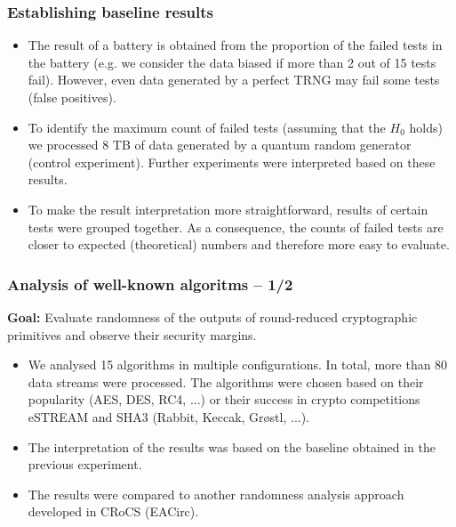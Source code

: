 \documentclass[aspectratio=169]{beamer}
\begin{document}
\begin{frame}
\frametitle{Establishing baseline results}
\begin{itemize}
\item The result of a battery is obtained from the proportion of the failed tests in the battery (e.g. we consider the data biased if more than 2 out of 15 tests fail). However, even data generated by a perfect TRNG may fail some tests (false positives).
\item To identify the maximum count of failed tests (assuming that the $H_0$ holds) we processed 8 TB of data generated by a quantum random generator (control experiment). Further experiments were interpreted based on these results.
\item To make the result interpretation more straightforward, results of certain tests were grouped together. As a consequence, the counts of failed tests are closer to expected (theoretical) numbers and therefore more easy to evaluate.
\end{itemize}
\end{frame}

\begin{frame}
\frametitle{Analysis of well-known algoritms -- 1/2}
\textbf{Goal:} Evaluate randomness of the outputs of round-reduced cryptographic primitives and observe their security margins.
\vspace{.3cm}
\begin{itemize}
\item We analysed 15 algorithms in multiple configurations. In total, more than 80 data streams were processed. The algorithms were chosen based on their popularity (AES, DES, RC4, ...) or their success in crypto competitions eSTREAM and SHA3 (Rabbit, Keccak, Gr\o stl, ...).
\item The interpretation of the results was based on the baseline obtained in the previous experiment.
\item The results were compared to another randomness analysis approach developed in CRoCS (EACirc).
\end{itemize}
\end{frame}
\end{document}
